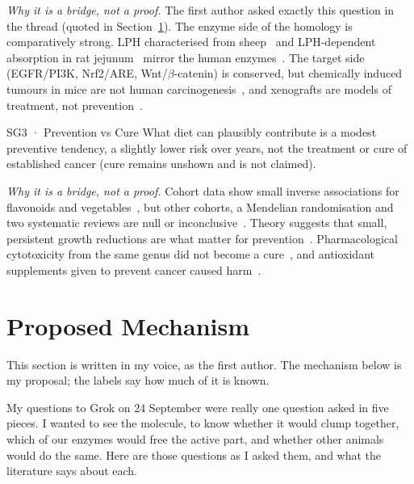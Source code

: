 \documentclass[11pt,a4paper]{article}
\begin{document}
\noindent\emph{Why it is a bridge, not a proof.} The first author asked exactly this question in the thread (quoted in Section~\ref{sec:mechanism}). The enzyme side of the homology is comparatively strong. LPH characterised from sheep~\cite{day2000} and LPH-dependent absorption in rat jejunum~\cite{day2003} mirror the human enzymes~\cite{nemeth2003}. The target side (EGFR/PI3K, Nrf2/ARE, Wnt/$\beta$-catenin) is conserved, but chemically induced tumours in mice are not human carcinogenesis~\cite{oi2012,manigandan2015}, and xenografts are models of treatment, not prevention~\cite{karna2011,zheng2012}.

\begin{sgbox}{SG3 · Prevention vs Cure}
What diet can plausibly contribute is a modest preventive tendency, a slightly lower risk over years, not the treatment or cure of established cancer (cure remains unshown and is not claimed).
\end{sgbox}

\noindent\emph{Why it is a bridge, not a proof.} Cohort data show small inverse associations for flavonoids and vegetables~\cite{knekt2002,aune2017,bondonno2019,parmenter2025}, but other cohorts, a Mendelian randomisation and two systematic reviews are null or inconclusive~\cite{wang2009,takachi2008,wei2024,grosso2017,jin2012}. Theory suggests that small, persistent growth reductions are what matter for prevention~\cite{akhmetzhanov2014}. Pharmacological cytotoxicity from the same genus did not become a cure~\cite{kasturi1998}, and antioxidant supplements given to prevent cancer caused harm~\cite{alphatocopherolbetac1994,omenn1996,klein2011}.

\section{Proposed Mechanism}
\label{sec:mechanism}

\begin{voicebox}
This section is written in my voice, as the first author. The mechanism below is my proposal; the labels say how much of it is known.
\end{voicebox}

My questions to Grok on 24 September were really one question asked in five pieces. I wanted to see the molecule, to know whether it would clump together, which of our enzymes would free the active part, and whether other animals would do the same. Here are those questions as I asked them, and what the literature says about each.
\end{document}
